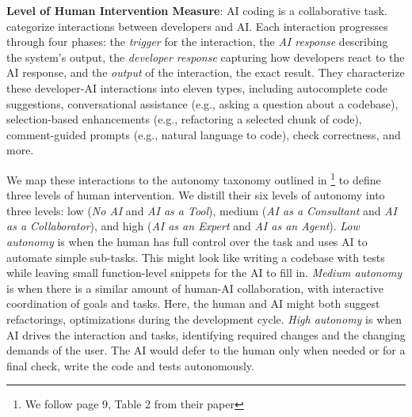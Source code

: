 \textbf{Level of Human Intervention Measure}: AI coding is a collaborative task. \citet{treude2025developers} categorize interactions between developers and AI. Each interaction progresses through four phases: the \textit{trigger} for the interaction, the \textit{AI response} describing the system's output, the \textit{developer response} capturing how developers react to the AI response, and the \textit{output} of the interaction, the exact result. They characterize these developer-AI interactions into eleven types, including autocomplete code suggestions, conversational assistance (e.g., asking a question about a codebase), selection-based enhancements (e.g., refactoring a selected chunk of code), comment-guided prompts (e.g., natural language to code), check correctness, and more. 

We map these interactions to the autonomy taxonomy outlined in \citet{morris2023levels}\footnote{We follow page 9, Table 2 from their paper} to define three levels of human intervention. We distill their six levels of autonomy into three levels: low (\textit{No AI} and \textit{AI as a Tool}), medium (\textit{AI as a Consultant} and \textit{AI as a Collaborator}), and high (\textit{AI as an Expert} and \textit{AI as an Agent}). \textit{Low autonomy} is when the human has full control over the task and uses AI to automate simple sub-tasks. This might look like writing a codebase with tests while leaving small function-level snippets for the AI to fill in. \textit{Medium autonomy} is when there is a similar amount of human-AI collaboration, with interactive coordination of goals and tasks. Here, the human and AI might both suggest refactorings, optimizations during the development cycle. \textit{High autonomy} is when AI drives the interaction and tasks, identifying required changes and the changing demands of the user. The AI would defer to the human only when needed or for a final check, write the code and tests autonomously.



